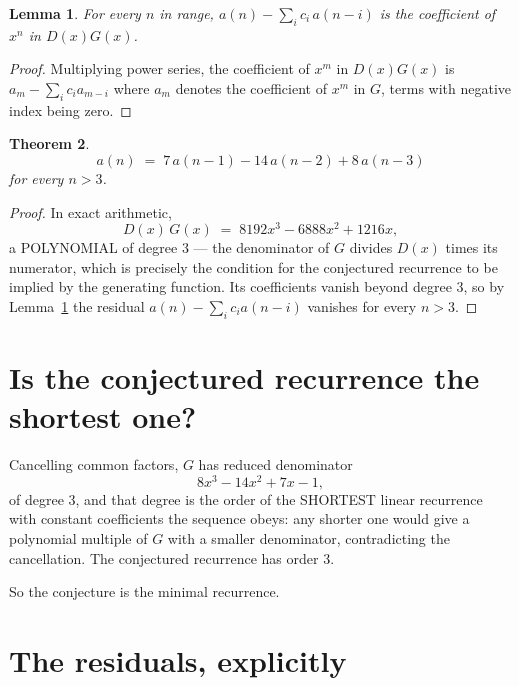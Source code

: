 \documentclass[11pt,a4paper]{article}
\theoremstyle{plain}
\newtheorem{theorem}{Theorem}
\newtheorem{lemma}[theorem]{Lemma}
\theoremstyle{definition}
\begin{document}
\begin{lemma}\label{lem:key}
For every $n$ in range, $a(n)-\sum_i c_i\,a(n-i)$ is the coefficient of $x^{n}$ in
$D(x)G(x)$.
\end{lemma}

\begin{proof}
Multiplying power series, the coefficient of $x^{m}$ in $D(x)G(x)$ is
$a_m-\sum_i c_i a_{m-i}$ where $a_m$ denotes the coefficient of $x^{m}$ in $G$, terms with
negative index being zero.
\end{proof}

\begin{theorem}
\[
a(n)\;=\;7\,a(n-1) - 14\,a(n-2) + 8\,a(n-3)
\]
for every $n>3$.
\end{theorem}

\begin{proof}
In exact arithmetic,
\[
D(x)\,G(x)\;=\;8192 x^{3} - 6888 x^{2} + 1216 x,
\]
a POLYNOMIAL of degree $3$ --- the denominator of $G$ divides $D(x)$ times its numerator,
which is precisely the condition for the conjectured recurrence to be implied by the
generating function. Its coefficients vanish beyond degree $3$, so by
Lemma~\ref{lem:key} the residual $a(n)-\sum_ic_ia(n-i)$ vanishes for every
$n>3$.
\end{proof}

\section{Is the conjectured recurrence the shortest one?}

Cancelling common factors, $G$ has reduced denominator
\[
8 x^{3} - 14 x^{2} + 7 x - 1,
\]
of degree $3$, and that degree is the order of the SHORTEST linear recurrence with
constant coefficients the sequence obeys: any shorter one would give a polynomial multiple of
$G$ with a smaller denominator, contradicting the cancellation. The conjectured recurrence has
order $3$.

So the conjecture is the minimal recurrence.

\section{The residuals, explicitly}
\end{document}
